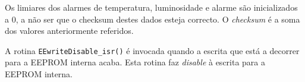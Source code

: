 \documentclass[a4paper,12pt]{article}
\begin{document}
Os limiares dos alarmes de temperatura, luminosidade e alarme são inicializados a 0, a não ser que o checksum destes dados esteja correcto. O \textit{checksum} é a soma dos valores anteriormente referidos.

A rotina \texttt{EEwriteDisable\_isr()} é invocada quando a escrita que está a decorrer para a EEPROM interna acaba. Esta rotina faz \textit{disable} à escrita para a EEPROM interna.
\end{document}
